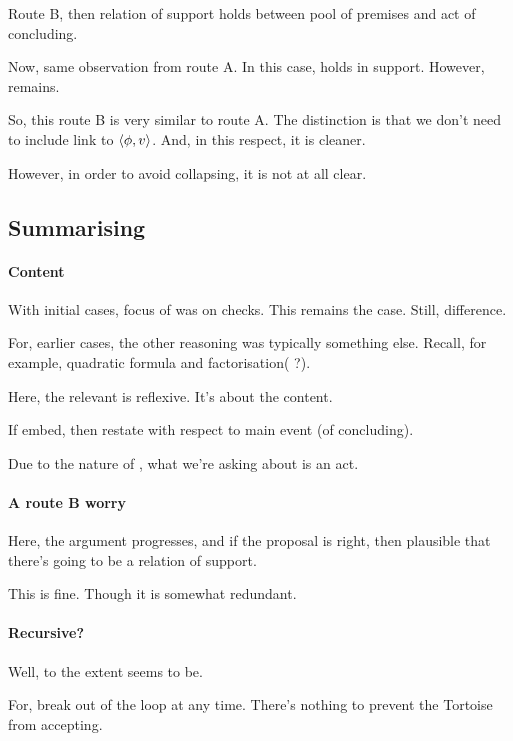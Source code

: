 \begin{note}
  Route B, then relation of support holds between pool of premises and act of concluding.

  Now, same observation from route A.
  In this case, \fc{} holds in support.
  However, \qzS{} remains.
\end{note}

\begin{note}
  So, this route B is very similar to route A.
  The distinction is that we don't need to include link to \(\langle \phi, v \rangle\).
  And, in this respect, it is cleaner.

  However, in order to avoid collapsing, it is not at all clear.
\end{note}

\subsection{Summarising}
\label{sec:summarising}

\paragraph{Content}

\begin{note}
  With initial cases, focus of \requ{} was on checks.
  This remains the case.
  Still, difference.

  For, earlier cases, the other reasoning was typically something else.
  Recall, for example, quadratic formula and factorisation({\color{red} ?}).

  Here, the relevant \qzS{} is reflexive.
  It's about the content.

  If embed, then restate \requ{} with respect to main event (of concluding).

  Due to the nature of \qzS{}, what we're asking about is an act.
\end{note}

\paragraph{A route B worry}

\begin{note}
  Here, the argument progresses, and if the proposal is right, then plausible that there's going to be a relation of support.

  This is fine.
  Though it is somewhat redundant.
\end{note}

\paragraph{Recursive?}

\begin{note}
  Well, to the extent \citeauthor{Carroll:1895uj} seems to be.

  For, break out of the loop at any time.
  There's nothing to prevent the Tortoise from accepting.
\end{note}





